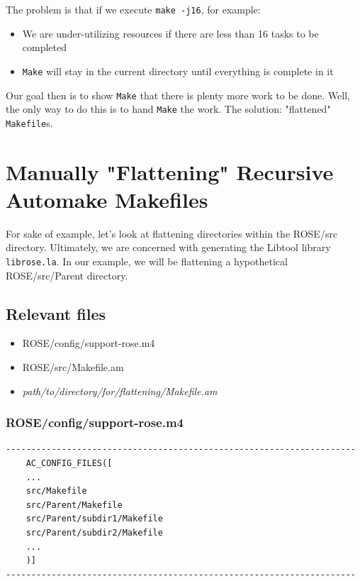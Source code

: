 The problem is that if we execute \texttt{make -j16}, for example:

    \begin{itemize}
    \item{We are under-utilizing resources if there are less than 16 tasks to be completed}
    \item{\texttt{Make} will stay in the current directory until everything is complete in it}
    \end{itemize}

Our goal then is to show \texttt{Make} that there is plenty more work to be done. Well, the only way to do
this is to hand \texttt{Make} the work. The solution: "flattened" \texttt{Makefile}s. 

%

    \section{Manually "Flattening" Recursive Automake Makefiles}

%
For sake of example, let's look at flattening directories within the ROSE/src directory.
Ultimately, we are concerned with generating the Libtool library \texttt{librose.la}. In
our example, we will be flattening a hypothetical ROSE/src/Parent directory.
\subsection{Relevant files}
	\begin{itemize}
	\item{ROSE/config/support-rose.m4}
	\item{ROSE/src/Makefile.am}
	\item{\textsl{path/to/directory/for/flattening/Makefile.am}}
	\end{itemize}
\subsubsection{ROSE/config/support-rose.m4}
    \begin{verbatim}
---------------------------------------------------------------------
    AC_CONFIG_FILES([
    ...
    src/Makefile
    src/Parent/Makefile
    src/Parent/subdir1/Makefile
    src/Parent/subdir2/Makefile
    ...
    )]
---------------------------------------------------------------------
\end{verbatim}

